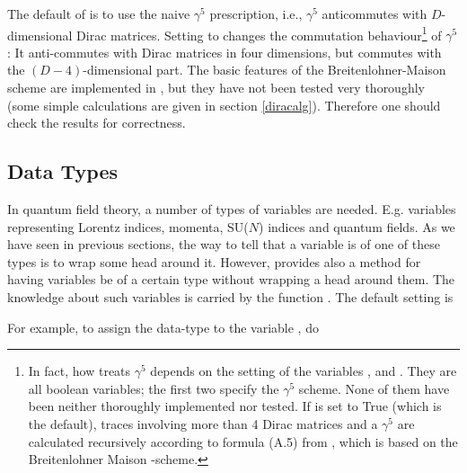 The default of  \fc is to use the naive $\gamma^{5}$ prescription, i.e.,
$\gamma^{5}$ anticommutes with $D$-dimensional Dirac matrices.
Setting  to  changes the commutation behaviour\footnote{
In fact, how \fc treats $\gamma^5$ depends on the setting of the variables ,  and . They are all boolean variables; the first two specify the $\gamma^5$ scheme. None of them have been neither thoroughly implemented nor tested. If  is set to True (which is the default), traces involving more than 4 Dirac matrices and a $\gamma^5$ are calculated recursively according to formula (A.5) from \cite{west}, which is based on the Breitenlohner Maison -scheme.
} of $\gamma^{5}$: It anti-commutes with Dirac matrices in four dimensions, 
but commutes with the $(D-4)$-dimensional part.
The basic features of the Breitenlohner-Maison scheme are implemented in 
\fc, but they have not been tested  very thoroughly (some simple 
calculations are given in  section \ref{diracalg}). 
Therefore one should check the results for correctness.

\subsection{Data Types}
\label{datatypes}

In quantum field theory, a number of types of variables are needed. E.g. variables representing Lorentz indices, momenta, SU($N$) indices and quantum fields. As we have seen in previous sections, the way to tell \fc that a variable is of one of these types is to wrap some head around it. However, \fc provides also a method for having variables be of a certain type without wrapping a head around them. The knowledge about such variables is carried by the function . The default setting is


For example, to assign the data-type  to the variable , do



